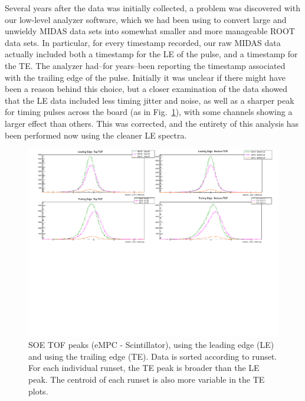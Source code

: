 Several years after the data was initially collected, a problem was discovered with our low-level analyzer software, which we had been using to convert large and unwieldy MIDAS data sets into somewhat smaller and more manageable ROOT data sets.  In particular, for every timestamp recorded, our raw MIDAS data actually included both a timestamp for the \ac{LE} of the pulse, and a timestamp for the \ac{TE}.  The analyzer had--for years--been reporting the timestamp associated with the trailing edge of the pulse.  Initially it was unclear if there might have been a reason behind this choice, but a closer examination of the data showed that the LE data included less timing jitter and noise, as well as a sharper peak for timing pulses across the board (as in Fig.~\ref{fig:LE_TE}), with some channels showing a larger effect than others.  This was corrected, and the entirety of this analysis has been performed now using the cleaner LE spectra.  


\begin{figure}[h!!t!]
	\centering
	\includegraphics[width=.999\linewidth]
	{Figures/LE_TE_peaks.pdf}
	\caption[LE and TE Timing Peaks]{SOE TOF peaks (eMPC - Scintillator), using the leading edge (LE) and using the trailing edge (TE).  Data is sorted according to runset.  For each individual runset, the TE peak is broader than the LE peak.  The centroid of each runset is also more variable in the TE plots.  
	}	
	\label{fig:LE_TE}
\end{figure}


